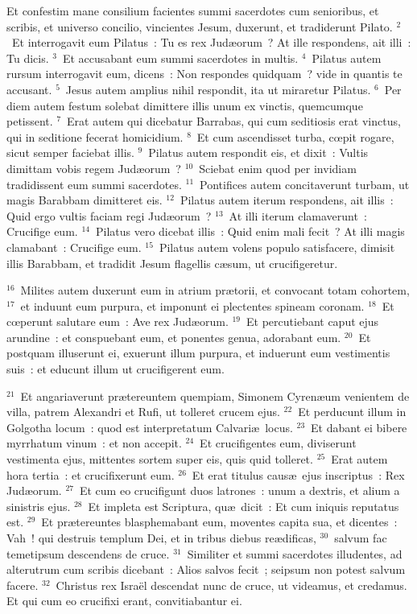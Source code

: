 \lettrine[lines=3,image=true,loversize=0.05,lraise=-0.03]{E}{}t confestim mane consilium facientes summi sacerdotes cum senioribus, et scribis, et universo concilio, vincientes Jesum, duxerunt, et tradiderunt Pilato.
${}^{2}$~Et interrogavit eum Pilatus~: Tu es rex Jud\ae orum~? At ille respondens, ait illi~: Tu dicis.
${}^{3}$~Et accusabant eum summi sacerdotes in multis.
${}^{4}$~Pilatus autem rursum interrogavit eum, dicens~: Non respondes quidquam~? vide in quantis te accusant.
${}^{5}$~Jesus autem amplius nihil respondit, ita ut miraretur Pilatus.
${}^{6}$~Per diem autem festum solebat dimittere illis unum ex vinctis, quemcumque petissent.
${}^{7}$~Erat autem qui dicebatur Barrabas, qui cum seditiosis erat vinctus, qui in seditione fecerat homicidium.
${}^{8}$~Et cum ascendisset turba, cœpit rogare, sicut semper faciebat illis.
${}^{9}$~Pilatus autem respondit eis, et dixit~: Vultis dimittam vobis regem Jud\ae orum~?
${}^{10}$~Sciebat enim quod per invidiam tradidissent eum summi sacerdotes.
${}^{11}$~Pontifices autem concitaverunt turbam, ut magis Barabbam dimitteret eis.
${}^{12}$~Pilatus autem iterum respondens, ait illis~: Quid ergo vultis faciam regi Jud\ae orum~?
${}^{13}$~At illi iterum clamaverunt~: Crucifige eum.
${}^{14}$~Pilatus vero dicebat illis~: Quid enim mali fecit~? At illi magis clamabant~: Crucifige eum.
${}^{15}$~Pilatus autem volens populo satisfacere, dimisit illis Barabbam, et tradidit Jesum flagellis c\ae sum, ut crucifigeretur.


${}^{16}$~Milites autem duxerunt eum in atrium pr\ae torii, et convocant totam cohortem,
${}^{17}$~et induunt eum purpura, et imponunt ei plectentes spineam coronam.
${}^{18}$~Et cœperunt salutare eum~: Ave rex Jud\ae orum.
${}^{19}$~Et percutiebant caput ejus arundine~: et conspuebant eum, et ponentes genua, adorabant eum.
${}^{20}$~Et postquam illuserunt ei, exuerunt illum purpura, et induerunt eum vestimentis suis~: et educunt illum ut crucifigerent eum.


${}^{21}$~Et angariaverunt pr\ae tereuntem quempiam, Simonem Cyren\ae um venientem de villa, patrem Alexandri et Rufi, ut tolleret crucem ejus.
${}^{22}$~Et perducunt illum in Golgotha locum~: quod est interpretatum Calvari\ae\ locus.
${}^{23}$~Et dabant ei bibere myrrhatum vinum~: et non accepit.
${}^{24}$~Et crucifigentes eum, diviserunt vestimenta ejus, mittentes sortem super eis, quis quid tolleret.
${}^{25}$~Erat autem hora tertia~: et crucifixerunt eum.
${}^{26}$~Et erat titulus caus\ae\ ejus inscriptus~: Rex Jud\ae orum.
${}^{27}$~Et cum eo crucifigunt duos latrones~: unum a dextris, et alium a sinistris ejus.
${}^{28}$~Et impleta est Scriptura, qu\ae\ dicit~: Et cum iniquis reputatus est.
${}^{29}$~Et pr\ae tereuntes blasphemabant eum, moventes capita sua, et dicentes~: Vah~! qui destruis templum Dei, et in tribus diebus re\ae dificas,
${}^{30}$~salvum fac temetipsum descendens de cruce.
${}^{31}$~Similiter et summi sacerdotes illudentes, ad alterutrum cum scribis dicebant~: Alios salvos fecit~; seipsum non potest salvum facere.
${}^{32}$~Christus rex Isra\"el descendat nunc de cruce, ut videamus, et credamus. Et qui cum eo crucifixi erant, convitiabantur ei.


